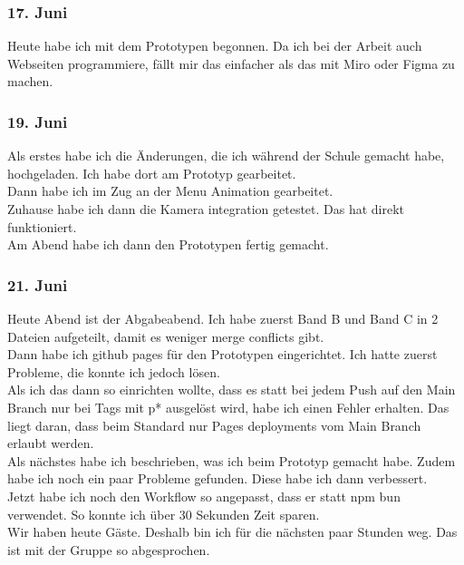 \documentclass[10pt]{article}
\begin{document}
	\subsubsection{17. Juni}
	Heute habe ich mit dem Prototypen begonnen. Da ich bei der Arbeit auch Webseiten programmiere, fällt mir das einfacher als das mit Miro oder Figma zu machen.
	\subsubsection{19. Juni}
	Als erstes habe ich die Änderungen, die ich während der Schule gemacht habe, hochgeladen. Ich habe dort am Prototyp gearbeitet.\\
	Dann habe ich im Zug an der Menu Animation gearbeitet.\\
	Zuhause habe ich dann die Kamera integration getestet. Das hat direkt funktioniert.\\
	Am Abend habe ich dann den Prototypen fertig gemacht.
	\subsubsection{21. Juni}
	Heute Abend ist der Abgabeabend. Ich habe zuerst Band B und Band C in 2 Dateien aufgeteilt, damit es weniger merge conflicts gibt.\\
	Dann habe ich github pages für den Prototypen eingerichtet. Ich hatte zuerst Probleme, die konnte ich jedoch lösen.\\
	Als ich das dann so einrichten wollte, dass es statt bei jedem Push auf den Main Branch nur bei Tags mit p* ausgelöst wird, habe ich einen Fehler erhalten. Das liegt daran, dass beim Standard nur Pages deployments vom Main Branch erlaubt werden.\\
	Als nächstes habe ich beschrieben, was ich beim Prototyp gemacht habe. Zudem habe ich noch ein paar Probleme gefunden. Diese habe ich dann verbessert.\\
	Jetzt habe ich noch den Workflow so angepasst, dass er statt npm bun verwendet. So konnte ich über 30 Sekunden Zeit sparen.\\
	Wir haben heute Gäste. Deshalb bin ich für die nächsten paar Stunden weg. Das ist mit der Gruppe so abgesprochen.
	
\end{document}
